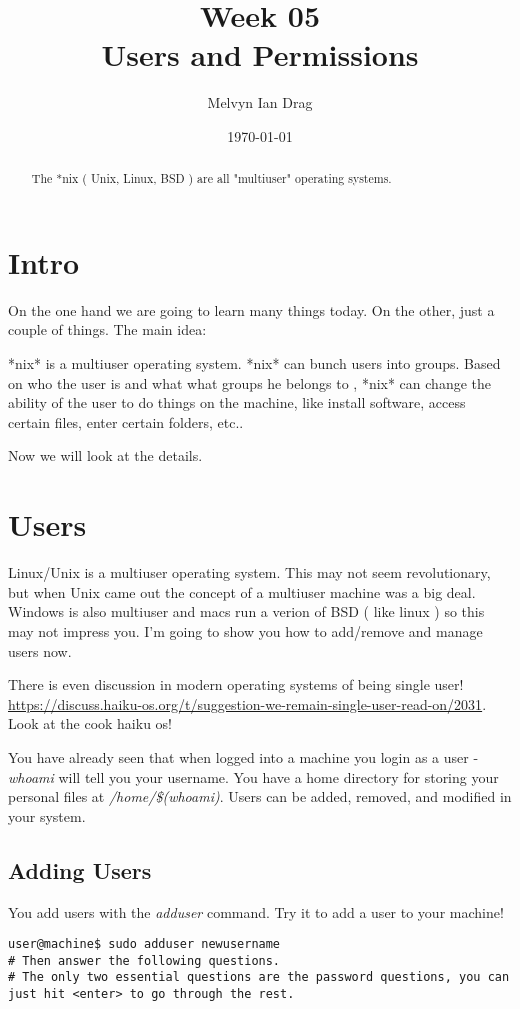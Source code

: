 \documentclass[10pt]{article}
\title{\textbf{Week 05} \\
Users and Permissions
}
\author{
	Melvyn Ian Drag
}
\date{\today}
\begin{document}
\maketitle

\begin{abstract}
The *nix ( Unix, Linux, BSD ) are all "multiuser" operating systems.
\end{abstract}

\section{Intro}
On the one hand we are going to learn many things today. On the other, just a
couple of things. The main idea:

*nix* is a multiuser operating system. *nix* can bunch users into groups. Based
on who the user is and what what groups he belongs to , *nix* can change the
ability of the user to do things on the machine, like  install software, access
certain files, enter certain folders, etc..

Now we will look at the details.

\section{Users}

Linux/Unix is a multiuser operating system. This may not seem revolutionary, but when Unix came out the concept of a multiuser machine was a big deal. Windows is also multiuser and macs run a verion of BSD ( like linux ) so this may not impress you. I'm going to show you how to add/remove and manage users now.

There is even discussion in modern operating systems of being single user!
\url{https://discuss.haiku-os.org/t/suggestion-we-remain-single-user-read-on/2031}. Look at the cook haiku os!

You have already seen that when logged into a machine you login as a user -
\textit{whoami} will tell you your username. You have a home directory for
storing your personal files at \textit{/home/\$(whoami)}. Users can be added, removed, and modified in your system.

\subsection{ Adding Users }
You add users with the \textit{adduser} command. Try it to add a user to your machine!

\begin{lstlisting}[style=term]
user@machine$ sudo adduser newusername
# Then answer the following questions.
# The only two essential questions are the password questions, you can just hit <enter> to go through the rest.
\end{lstlisting}
\end{document}

